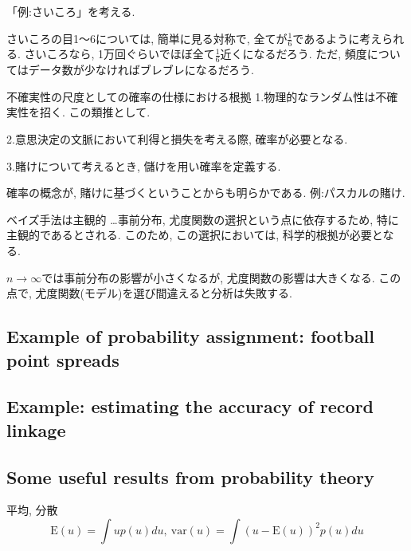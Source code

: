 \documentclass[11pt,a4pape,dvipdfmx]{jarticle}
\begin{document}
「例:さいころ」を考える.

さいころの目1～6については, 簡単に見る対称で, 全てが$\tfrac{1}{6}$であるように考えられる.
さいころなら, 1万回ぐらいでほぼ全て$\tfrac{1}{6}$近くになるだろう.
ただ, 頻度についてはデータ数が少なければブレブレになるだろう.


\begin{itembox}[l]{不確実性の尺度としての確率の仕様における根拠}
1.物理的なランダム性は不確実性を招く.
この類推として.

2.意思決定の文脈において利得と損失を考える際, 確率が必要となる.

3.賭けについて考えるとき, 儲けを用い確率を定義する.
\end{itembox}

確率の概念が, 賭けに基づくということからも明らかである.
例:パスカルの賭け.


\begin{itembox}[l]{ベイズ手法は主観的}
…事前分布, 尤度関数の選択という点に依存するため, 特に主観的であるとされる.
このため, この選択においては, 科学的根拠が必要となる.
\end{itembox}

$n\rightarrow \infty$では事前分布の影響が小さくなるが, 尤度関数の影響は大きくなる.
この点で, 尤度関数(モデル)を選び間違えると分析は失敗する.


\subsection{Example of probability assignment: football point spreads}


\subsection{Example: estimating the accuracy of record linkage}


\subsection{Some useful results from probability theory}
\begin{itembox}[l]{平均, 分散}
\[\text{E}(u)=\int u p(u)du,\ \text{var}(u)=\int (u-\text{E}(u))^2 p(u)du\]
\end{itembox}
\end{document}
